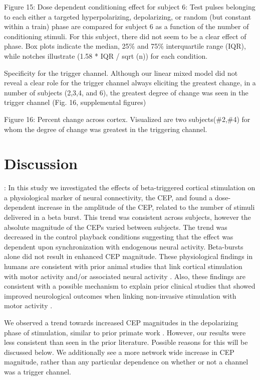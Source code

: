 Figure 15: Dose dependent conditioning effect for subject 6: Test pulses belonging to each either a targeted hyperpolarizing, depolarizing, or random (but constant within a train) phase are compared for subject 6 as a function of the number of conditioning stimuli. For this subject, there did not seem to be a clear effect of phase. Box plots indicate the median, 25\% and 75\% interquartile range (IQR), while notches illustrate (1.58 * IQR  / sqrt (n)) for each condition. 

Specificity for the trigger channel.
Although our linear mixed model did not reveal a clear role for the trigger channel always eliciting the greatest change, in a number of subjects (2,3,4, and 6), the greatest degree of change was seen in the trigger channel (Fig. 16, supplemental figures)


Figure 16: Percent change across cortex. Visualized are two subjects(\#2,\#4)  for whom the degree of change was greatest in the triggering channel.

\section{Discussion}:
In this study we investigated the effects of beta-triggered cortical stimulation on a physiological marker of neural connectivity, the CEP, and found a dose-dependent increase in the amplitude of the CEP, related to the number of stimuli delivered in a beta burst. This trend was consistent across subjects, however the absolute magnitude of the CEPs varied between subjects. The trend was decreased in the control playback conditions suggesting that the effect was dependent upon synchronization with endogenous neural activity. Beta-bursts alone did not result in enhanced CEP magnitude. These physiological findings in humans are consistent with prior animal studies that link cortical stimulation with motor activity and/or associated neural activity \cite{Bi1998,Dan2004,Jackson2006,Feldman2012,Ganguly2013,Lucas2013}. Also, these findings are consistent with a possible mechanism to explain prior clinical studies that showed improved neurological outcomes when linking non-invasive stimulation with motor activity \cite{Mrachacz-Kersting2015a,Kraus2016}. 

We observed a trend towards increased CEP magnitudes in the depolarizing phase of stimulation, similar to prior primate work \cite{Zanos2018}. However, our results were less consistent than seen in the prior literature. Possible reasons for this will be discussed below. We additionally see a more network wide increase in CEP magnitude, rather than any particular dependence on whether or not a channel was a trigger channel. 


